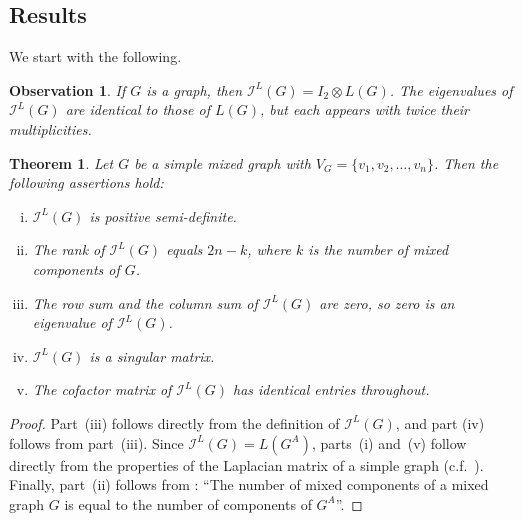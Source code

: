 \documentclass[12pt]{article}
\numberwithin{equation}{section}
\newtheorem{thm}{Theorem}[section]
\newtheorem{observation}{Observation}[section]
\begin{document}
	\subsection{Results}
	We start with the following.
	\begin{observation}\normalfont
		If $G$ is a graph, then $\mathcal{I}^L(G)=I_2\otimes L(G)$. The eigenvalues of $\mathcal{I}^L(G)$ are identical to those of $L(G)$, but each appears with twice their multiplicities.
	\end{observation}
	\begin{thm}
		Let $G$ be a simple mixed graph with $V_G=\{v_1,v_2,\ldots,v_n\}$. Then the following assertions hold:
		\begin{enumerate}[(i)]
			\item $\mathcal{I}^L(G)$ is positive semi-definite. 
			\item The rank of $\mathcal{I}^L(G)$ equals $2n-k$, where $k$ is the number of mixed components of $G$.
			\item The row sum and the column sum of $\mathcal{I}^L(G)$ are zero, so zero is an eigenvalue of $\mathcal{I}^L(G)$.
			\item $\mathcal{I}^L(G)$ is a singular matrix.
			\item The cofactor matrix of $\mathcal{I}^L(G)$ has identical entries throughout.
		\end{enumerate}
	\end{thm}
	\begin{proof}
	Part~(iii) follows directly from the definition of $\mathcal{I}^L(G)$, and part (iv) follows from part~(iii).		
		Since $\mathcal{I}^L(G)=L(G^A)$, parts~(i) and~(v) follow directly from the properties of the Laplacian matrix of a simple graph (c.f.~\cite[Lemma~4.3]{bapatbook}).
		Finally, part~(ii) follows from \cite[Corollary~6.1]{Kalaimatrices1}: ``The number of mixed components of a mixed graph $G$ is equal to the number of components of $G^A$''. 
	\end{proof}
	
\end{document}
